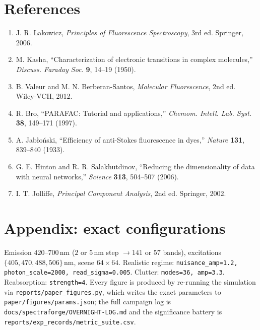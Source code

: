 \documentclass[11pt]{article}
\newcommand{\code}[1]{\texttt{\textcolor{codecol}{#1}}}
\begin{document}
\section*{References}
\begin{enumerate}[leftmargin=1.6em,itemsep=0.05em]
\item J. R. Lakowicz, \emph{Principles of Fluorescence Spectroscopy}, 3rd ed. Springer, 2006.
\item M. Kasha, ``Characterization of electronic transitions in complex molecules,''
\emph{Discuss. Faraday Soc.} \textbf{9}, 14--19 (1950).
\item B. Valeur and M. N. Berberan-Santos, \emph{Molecular Fluorescence}, 2nd ed. Wiley-VCH, 2012.
\item R. Bro, ``PARAFAC: Tutorial and applications,'' \emph{Chemom. Intell. Lab. Syst.} \textbf{38},
149--171 (1997).
\item A. Jab\l{}o\'nski, ``Efficiency of anti-Stokes fluorescence in dyes,'' \emph{Nature}
\textbf{131}, 839--840 (1933).
\item G. E. Hinton and R. R. Salakhutdinov, ``Reducing the dimensionality of data with neural
networks,'' \emph{Science} \textbf{313}, 504--507 (2006).
\item I. T. Jolliffe, \emph{Principal Component Analysis}, 2nd ed. Springer, 2002.
\end{enumerate}

\section*{Appendix: exact configurations}
\raggedright
Emission $420$--$700\,$nm ($2$ or $5\,$nm step $\to 141$ or $57$ bands), excitations
$\{405, 470, 488, 506\}\,$nm, scene $64\times 64$. Realistic regime:
\code{nuisance\_amp=1.2, photon\_scale=2000, read\_sigma=0.005}. Clutter:
\code{modes=36, amp=3.3}. Reabsorption: \code{strength=4}. Every figure is produced by re-running
the simulation via \code{reports/paper\_figures.py}, which writes the exact parameters to
\code{paper/figures/params.json}; the full campaign log is
\code{docs/spectraforge/OVERNIGHT-LOG.md} and the significance battery is
\code{reports/exp\_records/metric\_suite.csv}.
\end{document}
